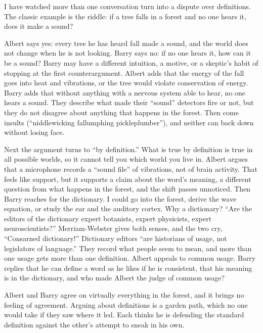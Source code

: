 
I have watched more than one conversation turn into a dispute over definitions. The classic example is the riddle: if a tree falls in a forest and no one hears it, does it make a sound? 

Albert says yes: every tree he has heard fall made a sound, and the world does not change when he is not looking. Barry says no: if no one hears it, how can it be a sound? Barry may have a different intuition, a motive, or a skeptic's habit of stopping at the first counterargument. Albert adds that the energy of the fall goes into heat and vibrations, or the tree would violate conservation of energy. Barry adds that without anything with a nervous system able to hear, no one hears a sound. They describe what made their ``sound'' detectors fire or not, but they do not disagree about anything that happens in the forest. Then come insults (``niddlewicking fallumphing pickleplumber''), and neither can back down without losing face.

Next the argument turns to ``by definition.'' What is true by definition is true in all possible worlds, so it cannot tell you which world you live in. Albert argues that a microphone records a ``sound file'' of vibrations, not of brain activity. That feels like support, but it supports a claim about the word's meaning, a different question from what happens in the forest, and the shift passes unnoticed. Then Barry reaches for the dictionary. I could go into the forest, derive the wave equation, or study the ear and the auditory cortex. Why a dictionary? ``Are the editors of the dictionary expert botanists, expert physicists, expert neuroscientists?'' Merriam-Webster gives both senses, and the two cry, ``Consarned dictionary!'' Dictionary editors ``are historians of usage, not legislators of language.'' They record what people seem to mean, and more than one usage gets more than one definition. Albert appeals to common usage. Barry replies that he can define a word as he likes if he is consistent, that his meaning is in the dictionary, and who made Albert the judge of common usage? 

Albert and Barry agree on virtually everything in the forest, and it brings no feeling of agreement. Arguing about definitions is a garden path, which no one would take if they saw where it led. Each thinks he is defending the standard definition against the other's attempt to sneak in his own.

